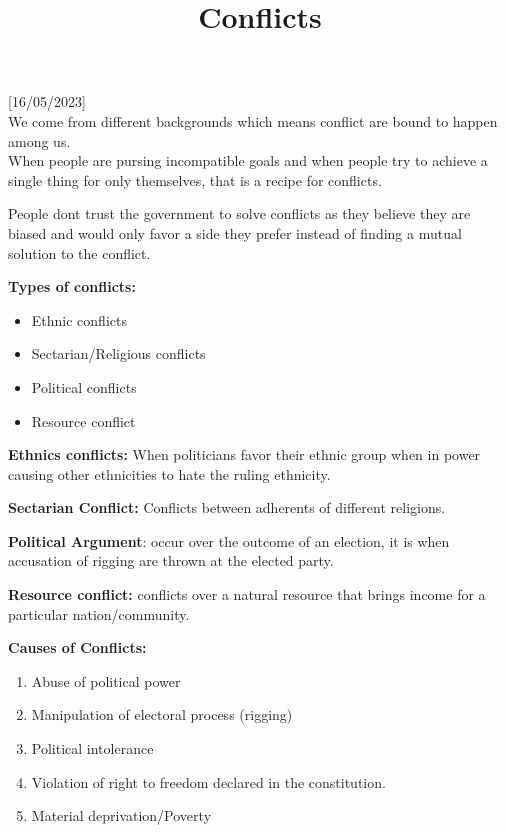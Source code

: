 \documentclass[
]{article}
\title{Conflicts}
\author{}
\date{}
\providecommand{\tightlist}{%
  \setlength{\itemsep}{0pt}\setlength{\parskip}{0pt}}
\begin{document}
\maketitle

{[}16/05/2023{]}\\
We come from different backgrounds which means conflict are bound to
happen among us.\\
When people are pursing incompatible goals and when people try to
achieve a single thing for only themselves, that is a recipe for
conflicts.

People don\textquotesingle t trust the government to solve conflicts as
they believe they are biased and would only favor a side they prefer
instead of finding a mutual solution to the conflict.

\textbf{Types of conflicts:}

\begin{itemize}
\tightlist
\item
  Ethnic conflicts
\item
  Sectarian/Religious conflicts
\item
  Political conflicts
\item
  Resource conflict
\end{itemize}

\textbf{Ethnics conflicts:} When politicians favor their ethnic group
when in power causing other ethnicities to hate the ruling ethnicity.

\textbf{Sectarian Conflict:} Conflicts between adherents of different
religions.

\textbf{Political Argument}: occur over the outcome of an election, it
is when accusation of rigging are thrown at the elected party.

\textbf{Resource conflict:} conflicts over a natural resource that
brings income for a particular nation/community.

\textbf{Causes of Conflicts:}

\begin{enumerate}
\tightlist
\item
  Abuse of political power
\item
  Manipulation of electoral process (rigging)
\item
  Political intolerance
\item
  Violation of right to freedom declared in the constitution.
\item
  Material deprivation/Poverty
\end{enumerate}
\end{document}
